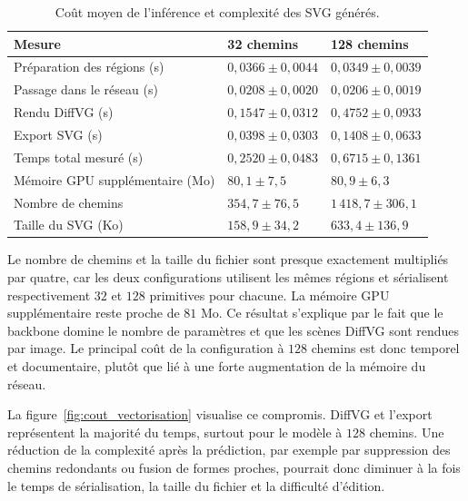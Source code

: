 \documentclass[12pt, a4paper, oneside]{report}
\begin{document}
\begin{table}[H]
    \centering
    \footnotesize
    \caption{Coût moyen de l'inférence et complexité des SVG générés.}
    \label{tab:cout_inference_svg}
    \begin{tabular}{p{4.2cm}p{4.0cm}p{4.0cm}}
        \toprule
        \textbf{Mesure} & \textbf{32 chemins} & \textbf{128 chemins} \\
        \midrule
        Préparation des régions (s) & $0{,}0366 \pm 0{,}0044$ & $0{,}0349 \pm 0{,}0039$ \\
        Passage dans le réseau (s) & $0{,}0208 \pm 0{,}0020$ & $0{,}0206 \pm 0{,}0019$ \\
        Rendu DiffVG (s) & $0{,}1547 \pm 0{,}0312$ & $0{,}4752 \pm 0{,}0933$ \\
        Export SVG (s) & $0{,}0398 \pm 0{,}0303$ & $0{,}1408 \pm 0{,}0633$ \\
        Temps total mesuré (s) & $0{,}2520 \pm 0{,}0483$ & $0{,}6715 \pm 0{,}1361$ \\
        Mémoire GPU supplémentaire (Mo) & $80{,}1 \pm 7{,}5$ & $80{,}9 \pm 6{,}3$ \\
        Nombre de chemins & $354{,}7 \pm 76{,}5$ & $1\,418{,}7 \pm 306{,}1$ \\
        Taille du SVG (Ko) & $158{,}9 \pm 34{,}2$ & $633{,}4 \pm 136{,}9$ \\
        \bottomrule
    \end{tabular}
\end{table}

Le nombre de chemins et la taille du fichier sont presque exactement multipliés par quatre, car les deux configurations utilisent les mêmes régions et sérialisent respectivement $32$ et $128$ primitives pour chacune. La mémoire GPU supplémentaire reste proche de $81$ Mo. Ce résultat s'explique par le fait que le backbone domine le nombre de paramètres et que les scènes DiffVG sont rendues par image. Le principal coût de la configuration à $128$ chemins est donc temporel et documentaire, plutôt que lié à une forte augmentation de la mémoire du réseau.

La figure~\ref{fig:cout_vectorisation} visualise ce compromis. DiffVG et l'export représentent la majorité du temps, surtout pour le modèle à $128$ chemins. Une réduction de la complexité après la prédiction, par exemple par suppression des chemins redondants ou fusion de formes proches, pourrait donc diminuer à la fois le temps de sérialisation, la taille du fichier et la difficulté d'édition.
\end{document}
